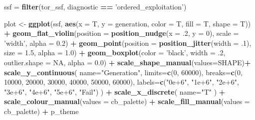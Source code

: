 \documentclass[]{book}
\newenvironment{Shaded}{\begin{snugshade}}{\end{snugshade}}
\newcommand{\DataTypeTok}[1]{\textcolor[rgb]{0.13,0.29,0.53}{#1}}
\newcommand{\DecValTok}[1]{\textcolor[rgb]{0.00,0.00,0.81}{#1}}
\newcommand{\FloatTok}[1]{\textcolor[rgb]{0.00,0.00,0.81}{#1}}
\newcommand{\KeywordTok}[1]{\textcolor[rgb]{0.13,0.29,0.53}{\textbf{#1}}}
\newcommand{\NormalTok}[1]{#1}
\newcommand{\OperatorTok}[1]{\textcolor[rgb]{0.81,0.36,0.00}{\textbf{#1}}}
\newcommand{\OtherTok}[1]{\textcolor[rgb]{0.56,0.35,0.01}{#1}}
\newcommand{\StringTok}[1]{\textcolor[rgb]{0.31,0.60,0.02}{#1}}
\begin{document}
\begin{Shaded}
\begin{Highlighting}[]
\NormalTok{ssf =}\StringTok{ }\KeywordTok{filter}\NormalTok{(tor_ssf, diagnostic }\OperatorTok{==}\StringTok{ 'ordered_exploitation'}\NormalTok{)}

\NormalTok{plot <-}\StringTok{ }\KeywordTok{ggplot}\NormalTok{(ssf, }\KeywordTok{aes}\NormalTok{(}\DataTypeTok{x =}\NormalTok{ T, }\DataTypeTok{y =}\NormalTok{ generation, }\DataTypeTok{color =}\NormalTok{ T, }\DataTypeTok{fill =}\NormalTok{ T, }\DataTypeTok{shape =}\NormalTok{ T)) }\OperatorTok{+}
\StringTok{  }\KeywordTok{geom_flat_violin}\NormalTok{(}\DataTypeTok{position =} \KeywordTok{position_nudge}\NormalTok{(}\DataTypeTok{x =} \FloatTok{.2}\NormalTok{, }\DataTypeTok{y =} \DecValTok{0}\NormalTok{), }\DataTypeTok{scale =} \StringTok{'width'}\NormalTok{, }\DataTypeTok{alpha =} \FloatTok{0.2}\NormalTok{) }\OperatorTok{+}
\StringTok{  }\KeywordTok{geom_point}\NormalTok{(}\DataTypeTok{position =} \KeywordTok{position_jitter}\NormalTok{(}\DataTypeTok{width =} \FloatTok{.1}\NormalTok{), }\DataTypeTok{size =} \FloatTok{1.5}\NormalTok{, }\DataTypeTok{alpha =} \FloatTok{1.0}\NormalTok{) }\OperatorTok{+}
\StringTok{  }\KeywordTok{geom_boxplot}\NormalTok{(}\DataTypeTok{color =} \StringTok{'black'}\NormalTok{, }\DataTypeTok{width =} \FloatTok{.2}\NormalTok{, }\DataTypeTok{outlier.shape =} \OtherTok{NA}\NormalTok{, }\DataTypeTok{alpha =} \FloatTok{0.0}\NormalTok{) }\OperatorTok{+}
\StringTok{  }\KeywordTok{scale_shape_manual}\NormalTok{(}\DataTypeTok{values=}\NormalTok{SHAPE)}\OperatorTok{+}
\StringTok{  }\KeywordTok{scale_y_continuous}\NormalTok{(}
    \DataTypeTok{name=}\StringTok{"Generation"}\NormalTok{,}
    \DataTypeTok{limits=}\KeywordTok{c}\NormalTok{(}\DecValTok{0}\NormalTok{, }\DecValTok{60000}\NormalTok{),}
    \DataTypeTok{breaks=}\KeywordTok{c}\NormalTok{(}\DecValTok{0}\NormalTok{, }\DecValTok{10000}\NormalTok{, }\DecValTok{20000}\NormalTok{, }\DecValTok{30000}\NormalTok{, }\DecValTok{40000}\NormalTok{, }\DecValTok{50000}\NormalTok{, }\DecValTok{60000}\NormalTok{),}
    \DataTypeTok{labels=}\KeywordTok{c}\NormalTok{(}\StringTok{"0e+6"}\NormalTok{, }\StringTok{"1e+6"}\NormalTok{, }\StringTok{"2e+6"}\NormalTok{, }\StringTok{"3e+6"}\NormalTok{, }\StringTok{"4e+6"}\NormalTok{, }\StringTok{"5e+6"}\NormalTok{, }\StringTok{"Fail"}\NormalTok{)}
\NormalTok{  ) }\OperatorTok{+}
\StringTok{  }\KeywordTok{scale_x_discrete}\NormalTok{(}
    \DataTypeTok{name=}\StringTok{"T"}
\NormalTok{  ) }\OperatorTok{+}
\StringTok{  }\KeywordTok{scale_colour_manual}\NormalTok{(}\DataTypeTok{values =}\NormalTok{ cb_palette) }\OperatorTok{+}
\StringTok{  }\KeywordTok{scale_fill_manual}\NormalTok{(}\DataTypeTok{values =}\NormalTok{ cb_palette) }\OperatorTok{+}
\StringTok{  }\NormalTok{p_theme}


\end{Highlighting}
\end{Shaded}
\end{document}
